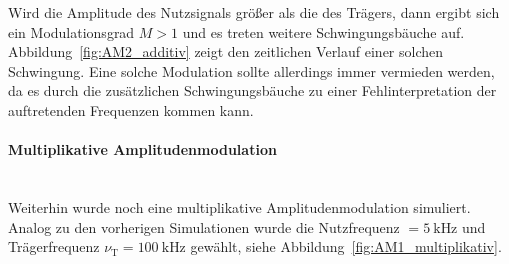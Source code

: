 \documentclass[a4paper,twoside,final]{article}
\begin{document}
Wird die Amplitude des Nutzsignals größer als die des Trägers, dann ergibt sich ein Modulationsgrad $M > 1$ und es treten weitere Schwingungsbäuche auf. Abbildung~\ref{fig:AM2_additiv} zeigt den zeitlichen Verlauf einer solchen Schwingung. Eine solche Modulation sollte allerdings immer vermieden werden, da es durch die zusätzlichen Schwingungsbäuche zu einer Fehlinterpretation der auftretenden Frequenzen kommen kann.
\FloatBarrier
\newpage
\paragraph{Multiplikative Amplitudenmodulation}$~$\\
Weiterhin wurde noch eine multiplikative Amplitudenmodulation simuliert. Analog zu den vorherigen Simulationen wurde die Nutzfrequenz $ = \SI{5}{\kilo\hertz}$ und Trägerfrequenz $\nu_\text{T} = \SI{100}{\kilo\hertz}$ gewählt, siehe Abbildung~\ref{fig:AM1_multiplikativ}.
\end{document}

